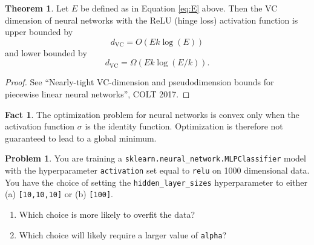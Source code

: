 \documentclass[10pt]{exam}
\theoremstyle{definition}
\newtheorem{problem}{Problem}
\newtheorem{fact}{Fact}
\newtheorem{theorem}{Theorem}
\newcommand{\dvc}{{d_{\text{VC}}}}
\begin{document}
\begin{theorem}
    Let $E$ be defined as in Equation \eqref{eq:E} above.
    Then the VC dimension of neural networks with the ReLU (hinge loss) activation function is upper bounded by
    \begin{equation}
        \dvc = O(Ek\log(E))
    \end{equation}
    and lower bounded by
    \begin{equation}
        \dvc = \Omega(Ek\log(E/k)).
    \end{equation}
\end{theorem}

\begin{proof}
    See ``Nearly-tight VC-dimension and pseudodimension bounds for piecewise linear neural networks'', COLT 2017.
\end{proof}

\begin{fact}
    The optimization problem for neural networks is convex only when the activation function $\sigma$ is the identity function.
    Optimization is therefore not guaranteed to lead to a global minimum.
\end{fact}


\newpage
\begin{problem}
    You are training a \lstinline{sklearn.neural_network.MLPClassifier} model with the hyperparameter \lstinline{activation} set equal to \lstinline{relu} on 1000 dimensional data.
    You have the choice of setting the \lstinline{hidden_layer_sizes} hyperparameter to either (a) \lstinline{[10,10,10]} or (b) \lstinline{[100]}.
    \begin{enumerate}
        \item Which choice is more likely to overfit the data?
            \vspace{3in}
        \item Which choice will likely require a larger value of \lstinline{alpha}?
            \vspace{3in}
    \end{enumerate}
\end{problem}
\end{document}
